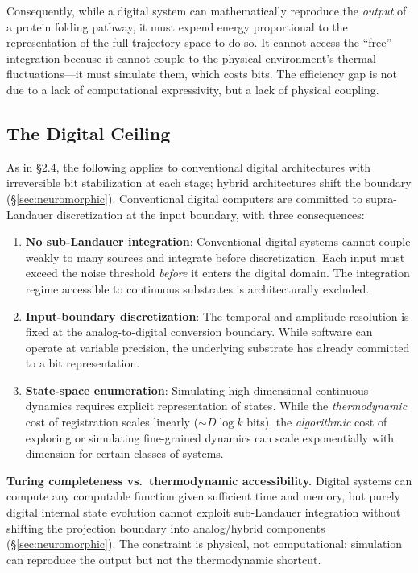 \documentclass[12pt]{article}
\numberwithin{equation}{section}
\begin{document}
Consequently, while a digital system can mathematically reproduce the \emph{output} of a protein folding pathway, it must expend energy proportional to the representation of the full trajectory space to do so. It cannot access the ``free'' integration because it cannot couple to the physical environment's thermal fluctuations---it must simulate them, which costs bits. The efficiency gap is not due to a lack of computational expressivity, but a lack of physical coupling.

\subsection{The Digital Ceiling}

As in \S2.4, the following applies to conventional digital architectures with irreversible bit stabilization at each stage; hybrid architectures shift the boundary (\S\ref{sec:neuromorphic}). Conventional digital computers are committed to supra-Landauer discretization at the input boundary, with three consequences:

\begin{enumerate}
\item \textbf{No sub-Landauer integration}: Conventional digital systems cannot couple weakly to many sources and integrate before discretization. Each input must exceed the noise threshold \emph{before} it enters the digital domain. The integration regime accessible to continuous substrates is architecturally excluded.

\item \textbf{Input-boundary discretization}: The temporal and amplitude resolution is fixed at the analog-to-digital conversion boundary. While software can operate at variable precision, the underlying substrate has already committed to a bit representation.

\item \textbf{State-space enumeration}: Simulating high-dimensional continuous dynamics requires explicit representation of states. While the \emph{thermodynamic} cost of registration scales linearly ($\sim D\log k$ bits), the \emph{algorithmic} cost of exploring or simulating fine-grained dynamics can scale exponentially with dimension for certain classes of systems.
\end{enumerate}

\textbf{Turing completeness vs.\ thermodynamic accessibility.} Digital systems can compute any computable function given sufficient time and memory, but purely digital internal state evolution cannot exploit sub-Landauer integration without shifting the projection boundary into analog/hybrid components (\S\ref{sec:neuromorphic}). The constraint is physical, not computational: simulation can reproduce the output but not the thermodynamic shortcut.
\end{document}
